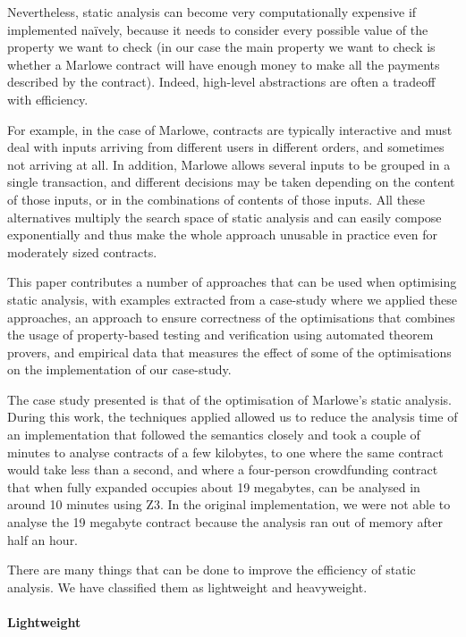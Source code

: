 \documentclass[english,runningheads]{llncs}
\begin{document}
Nevertheless, static analysis can become very computationally expensive if
implemented naïvely, because it needs to consider every possible value of the
property we want to check (in our case the main property we want to check
is whether a Marlowe contract will have enough money to make all the
payments described by the contract). Indeed, high-level abstractions
are often a tradeoff with efficiency.

For example, in the case of Marlowe, contracts are typically interactive
and must deal with inputs arriving from different users in different
orders, and sometimes not arriving at all. In addition, Marlowe allows
several inputs to be grouped in a single transaction, and different
decisions may be taken depending on the content of those inputs, or
in the combinations of contents of those inputs. All these alternatives
multiply the search space of static analysis and can easily compose
exponentially and thus make the whole approach unusable in practice
even for moderately sized contracts.

This paper contributes a number of approaches that can be used when
optimising static analysis, with examples extracted from a case-study where
we applied these approaches, an approach to ensure correctness
of the optimisations that combines the usage of property-based testing
and verification using automated theorem provers, and empirical data
that measures the effect of some of the optimisations on the implementation
of our case-study.

The case study presented is that of the optimisation of Marlowe's
static analysis. During this work, the techniques applied allowed
us to reduce the analysis time of an implementation that followed
the semantics closely and took a couple of minutes to analyse contracts
of a few kilobytes, to one where the same contract would take less
than a second, and where a four-person crowdfunding contract that
when fully expanded occupies about 19 megabytes, can be analysed in
around 10 minutes using Z3. In the original implementation, we were
not able to analyse the 19 megabyte contract because the analysis
ran out of memory after half an hour.

There are many things that can be done to improve the efficiency of
static analysis. We have classified them as lightweight and heavyweight. 

\paragraph*{Lightweight}
\end{document}
